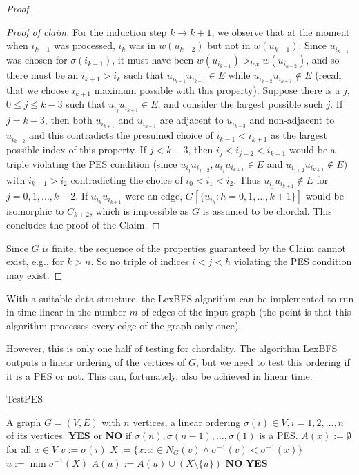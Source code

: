\begin{proof}
\begin{proof}[Proof of claim]
		For the induction step $k \to k + 1$, we observe that at the moment when $i_{k-1}$ was processed, $i_k$ was in $w(u_{k-2})$ but not in $w(u_{k-1})$. Since $u_{i_{k-1}}$ was chosen for $\sigma(i_{k-1})$, it must have been $w(u_{i_{k-1}}) >_{lex} w(u_{i_{k-2}})$, and so there must be an $i_{k+1} > i_k$ such that $u_{i_{k-1}} u_{i_{k+1}} \in E$ while $u_{i_{k-2}} u_{i_{k+1}} \notin E$ (recall that we choose $i_{k+1}$ maximum possible with this property). Suppose there is a $j$, $0 \leq j \leq k - 3$ such that $u_{i_j} u_{i_{k+1}} \in E$, and consider the largest possible such $j$. If $j = k - 3$, then both $u_{i_{k+1}}$ and $u_{i_{k-1}}$ are adjacent to $u_{i_{k-3}}$ and non-adjacent to $u_{i_{k-2}}$ and this contradicts the presumed choice of
		$i_{k-1} < i_{k+1}$ as the largest possible index of this property. If $j < k - 3$, then $i_j < i_{j+2} < i_{k+1}$ would be	a triple violating the PES condition (since $u_{i_j} u_{i_{j+2}}, u_{i_j} u_{i_{k+1}} \in E$ and $u_{i_{j+2}} u_{i_{k+1}} \notin E$) with $i_{k+1} > i_2$ contradicting the choice of $i_0 < i_1 < i_2$. Thus $u_{i_j} u_{i_{k+1}} \notin E$ for $j = 0, 1, \dots, k - 2$. If $u_{i_k} u_{i_{k+1}}$ were an edge, $G[\{u_{i_h} : h = 0, 1, \dots, k + 1\}]$ would be isomorphic to $C_{k+2}$, which is impossible as $G$ is assumed to be chordal. This concludes the proof of the Claim.
	\end{proof}
	
	Since $G$ is finite, the sequence of the properties guaranteed by the Claim cannot exist, e.g., for $k > n$. So no triple of indices $i < j < h$ violating the PES condition may exist.
\end{proof}

With a suitable data structure, the LexBFS algorithm can be implemented to run in time linear in the number $m$ of edges of the input graph (the point is that this algorithm processes every edge of the graph only once).

However, this is only one half of testing for chordality. The algorithm LexBFS outputs a linear ordering of the vertices of $G$, but we need to test this ordering if it is a PES or not. This can, fortunately, also be achieved in linear time.

\begin{algorithm}[!ht]
	\caption{TestPES \PES}
	\begin{algorithmic}[1]
		\Require A graph $G = (V, E)$ with $n$ vertices, a linear ordering $\sigma(i) \in V, i = 1, 2, \dots, n$ of its vertices.
		\Ensure \textbf{YES} or \textbf{NO} if $\sigma(n), \sigma(n-1), \dots, \sigma(1)$ is a PES.
		\State $A(x) := \emptyset$ for all $x \in V$
			\State $v:= \sigma(i)$
			\State $X:= \{x : x \in N_G (v) \land \sigma^{-1}(v) < \sigma^{-1}(x)\}$
				\State $u := \min \sigma^{-1}(X)$
				\State $A(u) := A(u) \cup (X \setminus \{u\})$
			\EndIf
				\State \Return \textbf{NO}
			\EndIf
		\EndFor
		\State \Return \textbf{YES} \PES
	\end{algorithmic}
\end{algorithm}

